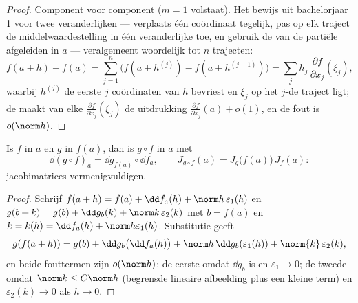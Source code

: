\begin{proof}
Component voor component ($m = 1$ volstaat). Het bewijs uit
bachelorjaar 1 voor twee veranderlijken --- verplaats één
coördinaat tegelijk, pas op elk traject de
middelwaardestelling in één veranderlijke toe, en gebruik de
 van de partiële afgeleiden in $a$ --- veralgemeent
woordelijk tot $n$ trajecten:
\[
f(a + h) - f(a) = \sum_{j=1}^{n} \bigl(f(a + h^{(j)}) - f(a +
h^{(j-1)})\bigr)
= \sum_j h_j\,\frac{\partial f}{\partial x_j}(\xi_j),
\]
waarbij $h^{(j)}$ de eerste $j$ coördinaten van $h$ bevriest en
$\xi_j$ op het $j$-de traject ligt; de  maakt van elke
$\frac{\partial f}{\partial x_j}(\xi_j)$ de uitdrukking
$\frac{\partial f}{\partial x_j}(a) + o(1)$, en de fout is
$o(\norm h)$.
\end{proof}

\begin{theorem}[Kettingregel]\label{thm:b2:diffcalc:chainrule}
Is $f$  in $a$ en $g$ in $f(a)$, dan is $g \circ
f$  in $a$ met
\[
\dd(g \circ f)_a = \dd g_{f(a)} \circ \dd f_a ,
\qquad
J_{g\circ f}(a) = J_g\bigl(f(a)\bigr)\,J_f(a) :
\]
jacobimatrices vermenigvuldigen.
\end{theorem}

\begin{proof}
Schrijf $f(a + h) = f(a) + \dd f_a(h) + \norm h\,\varepsilon_1(h)$
en $g(b + k) = g(b) + \dd g_b(k) + \norm k\,\varepsilon_2(k)$ met
$b = f(a)$ en $k = k(h) = \dd f_a(h) + \norm h \varepsilon_1(h)$.
Substitutie geeft
\[
g(f(a+h)) = g(b) + \dd g_b\bigl(\dd f_a(h)\bigr)
+ \norm h\,\dd g_b(\varepsilon_1(h)) + \norm{k}\,\varepsilon_2(k),
\]
en beide fouttermen zijn $o(\norm h)$: de eerste omdat $\dd g_b$
 is en $\varepsilon_1 \to 0$; de tweede omdat $\norm k \leq
C\norm h$ (begrensde lineaire afbeelding plus een kleine term) en
$\varepsilon_2(k) \to 0$ als $h \to 0$.
\end{proof}

